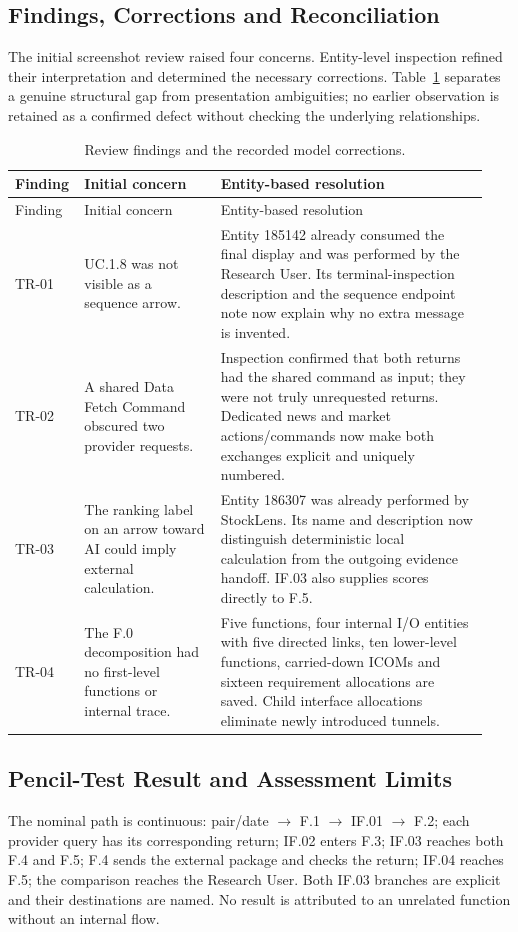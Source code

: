 \documentclass[11pt,letterpaper]{article}
\begin{document}
\subsection{Findings, Corrections and Reconciliation}
The initial screenshot review raised four concerns. Entity-level inspection refined their interpretation and determined the necessary corrections. Table~\ref{tab:findings} separates a genuine structural gap from presentation ambiguities; no earlier observation is retained as a confirmed defect without checking the underlying relationships.
{\small
\begin{longtable}{@{}>{\raggedright\arraybackslash}p{0.1\linewidth}>{\raggedright\arraybackslash}p{0.29\linewidth}>{\raggedright\arraybackslash}p{0.55\linewidth}@{}}
\caption{Review findings and the recorded model corrections.}\label{tab:findings}\\
\toprule Finding & Initial concern & Entity-based resolution\\\midrule\endfirsthead
\toprule Finding & Initial concern & Entity-based resolution\\\midrule\endhead
TR-01 & UC.1.8 was not visible as a sequence arrow. & Entity 185142 already consumed the final display and was performed by the Research User. Its terminal-inspection description and the sequence endpoint note now explain why no extra message is invented.\\[5pt]
TR-02 & A shared Data Fetch Command obscured two provider requests. & Inspection confirmed that both returns had the shared command as input; they were not truly unrequested returns. Dedicated news and market actions/commands now make both exchanges explicit and uniquely numbered.\\[5pt]
TR-03 & The ranking label on an arrow toward AI could imply external calculation. & Entity 186307 was already performed by StockLens. Its name and description now distinguish deterministic local calculation from the outgoing evidence handoff. IF.03 also supplies scores directly to F.5.\\[5pt]
TR-04 & The F.0 decomposition had no first-level functions or internal trace. & Five functions, four internal I/O entities with five directed links, ten lower-level functions, carried-down ICOMs and sixteen requirement allocations are saved. Child interface allocations eliminate newly introduced tunnels.\\[5pt]
\bottomrule\end{longtable}
}

\subsection{Pencil-Test Result and Assessment Limits}
The nominal path is continuous: pair/date $\rightarrow$ F.1 $\rightarrow$ IF.01 $\rightarrow$ F.2; each provider query has its corresponding return; IF.02 enters F.3; IF.03 reaches both F.4 and F.5; F.4 sends the external package and checks the return; IF.04 reaches F.5; the comparison reaches the Research User. Both IF.03 branches are explicit and their destinations are named. No result is attributed to an unrelated function without an internal flow.
\end{document}

